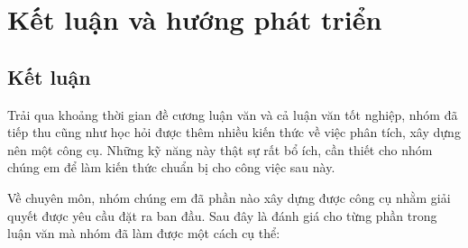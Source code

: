 \setcounter{chapter}{5}
\chapter{Kết luận và hướng phát triển}

\section{Kết luận}
Trải qua khoảng thời gian đề cương luận văn và cả luận văn tốt nghiệp, nhóm đã tiếp thu cũng như học hỏi được thêm nhiều kiến thức về việc phân tích, xây dựng nên một công cụ. Những kỹ năng này thật sự rất bổ ích, cần thiết cho nhóm chúng em để làm kiến thức chuẩn bị cho công việc sau này.

Về chuyên môn, nhóm chúng em đã phần nào xây dựng được công cụ nhằm giải quyết được yêu cầu đặt ra ban đầu. Sau đây là đánh giá cho từng phần trong luận văn mà nhóm đã làm được một cách cụ thể:

